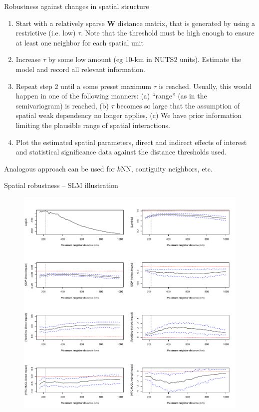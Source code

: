 \documentclass{beamer}
\begin{document}
\begin{frame}{Robustness against changes in spatial structure}
\begin{enumerate}
\item Start with a relatively sparse $\bm{W}$ distance matrix, that is generated by using a restrictive (i.e. low) $\tau$. Note that the threshold must be high enough to ensure at least one neighbor for each spatial unit
\medskip
\item Increase $\tau$ by some low amount (eg 10-km in NUTS2 units). Estimate the model and record all relevant information. 
\medskip
\item Repeat step 2 until a some preset maximum $\tau$ is reached. Usually, this would happen in one of the following manners: (a) ``range'' (as in the semivariogram) is reached, (b) $\tau$ becomes so large that the assumption of spatial weak dependency no longer applies, (c) We have prior information limiting the plausible range of spatial interactions.
\medskip
\item Plot the estimated spatial parameters, direct and indirect effects of interest and statistical significance data  against the distance thresholds used.
\end{enumerate}
Analogous approach can be used for $k$NN, contiguity neighbors, etc.
\end{frame}
\begin{frame}{Spatial robustness -- SLM illustration}
\vspace{-0.3cm}
\begin{figure}
	\includegraphics[width=.65\textwidth]{IMG/sp_Stability.pdf}
\end{figure}
\end{frame}
\end{document}
